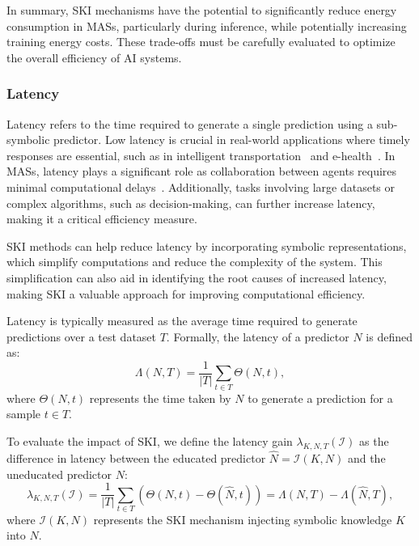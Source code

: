 %
In summary, \gls{SKI} mechanisms have the potential to significantly reduce energy consumption in \glspl{MAS}, particularly during inference, while potentially increasing training energy costs.
%
These trade-offs must be carefully evaluated to optimize the overall efficiency of \gls{AI} systems.


\subsubsection{Latency}\label{subsubsec:ski-meets-intelligent-agents-latency}
%
Latency refers to the time required to generate a single prediction using a sub-symbolic predictor.
%
Low latency is crucial in real-world applications where timely responses are essential, such as in intelligent transportation~\cite{grigorescu_survey_2020} and e-health~\cite{esteva_deep_2021}.
%
In \glspl{MAS}, latency plays a significant role as collaboration between agents requires minimal computational delays~\cite{hou_consensus_2017}.
%
Additionally, tasks involving large datasets or complex algorithms, such as decision-making, can further increase latency, making it a critical efficiency measure.

%
\gls{SKI} methods can help reduce latency by incorporating symbolic representations, which simplify computations and reduce the complexity of the system.
%
This simplification can also aid in identifying the root causes of increased latency, making \gls{SKI} a valuable approach for improving computational efficiency.

%
Latency is typically measured as the average time required to generate predictions over a test dataset \(T\).
%
Formally, the latency of a predictor \(N\) is defined as:
%
\begin{equation}
    \label{eq:latency}
    \Lambda(N, T) = \frac{1}{\vert T \vert} \sum_{t \in T} \Theta(N, t),
\end{equation}
%
where \(\Theta(N, t)\) represents the time taken by \(N\) to generate a prediction for a sample \(t \in T\).

%
To evaluate the impact of \gls{SKI}, we define the latency gain $\lambda_{K, N, T}(\mathcal{I})$ as the difference in latency between the educated predictor \(\hat{N} = \mathcal{I}(K, N)\) and the uneducated predictor \(N\):
%
\begin{equation}
    \label{eq:latency-gain}
    \lambda_{K, N, T}(\mathcal{I}) = \frac{1}{\vert T \vert} \sum_{t \in T} \left( \Theta(N, t) - \Theta(\hat{N}, t) \right) = \Lambda(N, T) - \Lambda(\hat{N}, T),
\end{equation}
%
where \(\mathcal{I}(K, N)\) represents the \gls{SKI} mechanism injecting symbolic knowledge \(K\) into \(N\).

